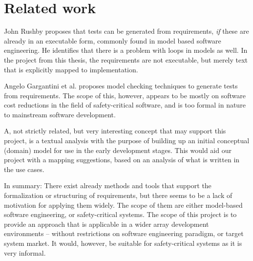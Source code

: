 \section{Related work}
John Rushby\cite{rushby2008automated} proposes that tests can be generated from requirements, \emph{if} these are already in an executable form, commonly found in model based software engineering. He identifies that there is a problem with loops in models as well. In the project from this thesis, the requirements are not executable, but merely text that is explicitly mapped to implementation.\medskip

\noindent Angelo Gargantini et al. proposes model checking techniques to generate tests from requirements\cite{gargantini1999using}. The scope of this, however, appears to be mostly on software cost reductions in the field of safety-critical software, and is too formal in nature to mainstream software development.\medskip

\noindent A, not strictly related, but very interesting concept that may support this project, is a textual analysis with the purpose of building up an initial conceptual (domain) model for use in the early development stages\cite{kop2010natural}. This would aid our project with a mapping suggestions, based on an analysis of what is written in the use cases.\medskip

\noindent In summary: There exist already methods and tools that support the formalization or structuring of requirements, but there seems to be a lack of motivation for applying them widely. The scope of them are either model-based software engineering, or safety-critical systems. The scope of this project is to provide an approach that is applicable in a wider array development environments -- without restrictions on software engineering paradigm, or target system market. It would, however,  be suitable for safety-critical systems as it is very informal.
